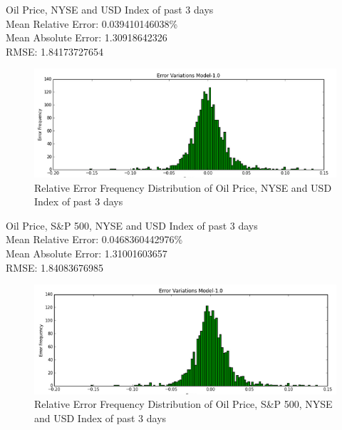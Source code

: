 \documentclass[runningheads]{llncs}
\begin{document}
Oil Price, NYSE and USD Index of past 3 days \\ 
Mean Relative Error: 0.039410146038\% \\
Mean Absolute Error: 1.30918642326 \\
RMSE: 1.84173727654 \\
\begin{figure}
\centering
\includegraphics[width=\textwidth]{OILNYSEUSD_Daily.png}
\caption{Relative Error Frequency Distribution of Oil Price, NYSE and USD Index of past 3 days}
\label{fig:OILNYSEUSD_Daily.png}
\end{figure}

Oil Price, S\&P 500, NYSE and USD Index of past 3 days \\ 
Mean Relative Error: 0.0468360442976\% \\
Mean Absolute Error: 1.31001603657 \\
RMSE: 1.84083676985 \\
\begin{figure}
\centering
\includegraphics[width=\textwidth]{OILSP500NYSEUSD_Daily.png}
\caption{Relative Error Frequency Distribution of Oil Price, S\&P 500, NYSE and USD Index of past 3 days}
\label{fig:OILSP500NYSEUSD_Daily.png}
\end{figure}
\end{document}
